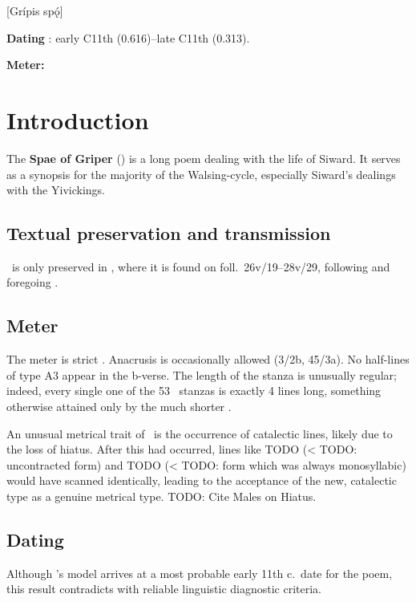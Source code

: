 [Grípis spǫ́]

\begin{flushright}%
\textbf{Dating} \parencite{Sapp2022}: early C11th (0.616)--late C11th (0.313).

\textbf{Meter:} \Fornyrdislag%
\end{flushright}

\section{Introduction}

The \textbf{Spae of Griper} (\Gripisspa) is a long poem dealing with the life of Siward.  It serves as a synopsis for the majority of the Walsing-cycle, especially Siward’s dealings with the Yivickings.

\subsection{Textual preservation and transmission}

\Gripisspa\ is only preserved in \Regius, where it is found on foll.~26v/19--28v/29, following  and foregoing .

\subsection{Meter}

The meter is strict \Fornyrdislag.  Anacrusis is occasionally allowed (3/2b, 45/3a).  No half-lines of type A3 appear in the b-verse.
The length of the stanza is unusually regular; indeed, every single one of the 53 \Fornyrdislag\ stanzas is exactly 4 lines long, something otherwise attained only by the much shorter .

An unusual metrical trait of \Gripisspa\ is the occurrence of catalectic lines, likely due to the loss of hiatus.  After this had occurred, lines like TODO (< TODO: uncontracted form) and TODO (< TODO: form which was always monosyllabic) would have scanned identically, leading to the acceptance of the new, catalectic type as a genuine metrical type.  TODO: Cite Males on Hiatus.

\subsection{Dating}

Although \textcite{Sapp2022}’s model arrives at a most probable early 11th c.~date for the poem, this result contradicts with reliable linguistic diagnostic criteria.

